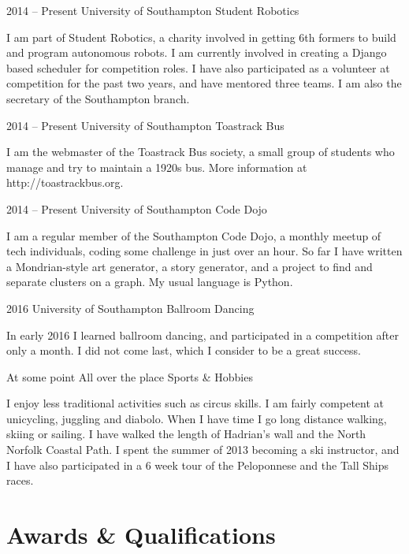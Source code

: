 \documentclass{tccv}
\begin{document}
\begin{eventlist}

\item{2014 -- Present}
     {University of Southampton}
     {Student Robotics}

I am part of Student Robotics, a charity involved in getting 6th formers to build and program autonomous robots. I am currently involved in creating a Django based scheduler for competition roles. I have also participated as a volunteer at competition for the past two years, and have mentored three teams. I am also the secretary of the Southampton branch.

\item{2014 -- Present}
     {University of Southampton}
     {Toastrack Bus}
     
I am the webmaster of the Toastrack Bus society, a small group of students who manage and try to maintain a 1920s bus. More information at http://toastrackbus.org.

\item{2014 -- Present}
     {University of Southampton}
     {Code Dojo}

I am a regular member of the Southampton Code Dojo, a monthly meetup of tech individuals, coding some challenge in just over an hour. So far I have written a Mondrian-style art generator, a story generator, and a project to find and separate clusters on a graph. My usual language is Python.

\item{2016}
     {University of Southampton}
     {Ballroom Dancing}
     
In early 2016 I learned ballroom dancing, and participated in a competition after only a month. I did not come last, which I consider to be a great success.  
     

\item{At some point}
     {All over the place}
     {Sports \& Hobbies}

I enjoy less traditional activities such as circus skills. I am fairly competent at unicycling, juggling and diabolo. When I have time I go long distance walking, skiing or sailing. I have walked the length of Hadrian's wall and the North Norfolk Coastal Path. I spent the summer of 2013 becoming a ski instructor, and I have also participated in a 6 week tour of the Peloponnese and the Tall Ships races.

\end{eventlist}

\section{Awards \& Qualifications}
\end{document}
